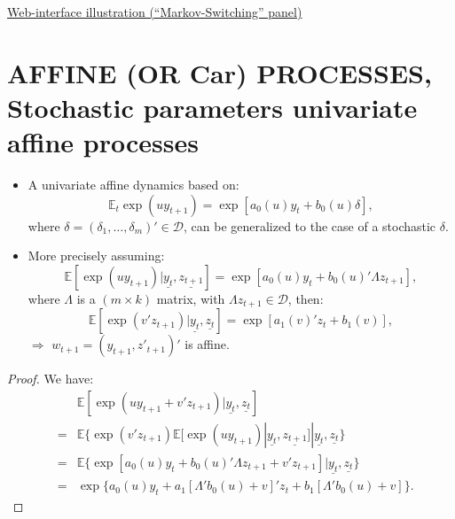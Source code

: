 \documentclass[
  12pt,
]{book}
\theoremstyle{definition}
\theoremstyle{definition}
\theoremstyle{definition}
\theoremstyle{definition}
\theoremstyle{remark}
\begin{document}
\href{https://jrenne.shinyapps.io/Affine/}{Web-interface illustration (``Markov-Switching'' panel)}

\hypertarget{stoch}{%
\section{AFFINE (OR Car) PROCESSES, Stochastic parameters univariate affine processes}\label{stoch}}

\begin{itemize}
\item
  A univariate affine dynamics based on:
  \[
  \mathbb{E}_t   \exp(u y_{t+1}) = \exp[a_0(u)y_t+b_0(u)\delta],
  \]
  where \(\delta = (\delta_1,\dots,\delta_m)' \in \mathcal{D}\), can be generalized to the case of a stochastic \(\delta\).
\item
  More precisely assuming:
  \[
  \mathbb{E}[\exp(u y_{t+1})|\underline{y_t}, \underline{z_{t+1}}] = \exp[a_0(u)y_t+b_0(u)'\Lambda z_{t+1}],
  \]
  where \(\Lambda\) is a \((m\times k)\) matrix, with \(\Lambda z_{t+1} \in \mathcal{D}\), then:
  \[
  \mathbb{E}[\exp(v' z_{t+1})|\underline{y_t}, \underline{z_{t}}] = \exp[a_1(v)'z_t+b_1(v)],
  \]
  \(\Rightarrow\) \(w_{t+1} = (y_{t+1}, z'_{t+1})'\) is affine.
\end{itemize}

\begin{proof}
We have:
\begin{eqnarray*}
&&\mathbb{E}[\exp(u y_{t+1}+v'z_{t+1})|\underline{y_t}, \underline{z_{t}}] \\
&=& \mathbb{E}\{\exp(v' z_{t+1})\mathbb{E}[\exp(u y_{t+1})|\underline{y_t},
\underline{z_{t+1}}]|\underline{y_t}, \underline{z_{t}} \} \\
&=& \mathbb{E}\{\exp[a_0(u) y_{t}+b_0(u)'\Lambda z_{t+1}+v'z_{t+1}]|\underline{y_t},
\underline{z_{t}} \} \\
&=& \exp\{ a_0(u) y_{t}+a_1[\Lambda' b_0(u)+v]'z_t+b_1 [\Lambda' b_0(u)+v]\}.
\end{eqnarray*}
\end{proof}
\end{document}
